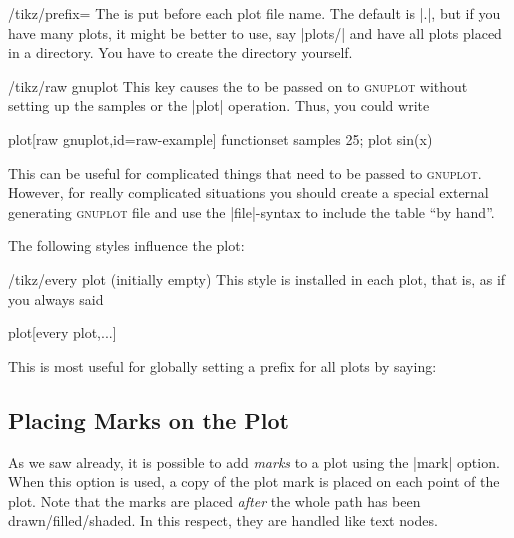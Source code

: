 \begin{key}{/tikz/prefix=}
    The  is put before each plot file name. The default is
    |\jobname.|, but if you have many plots, it might be better to use, say
    |plots/| and have all plots placed in a directory. You have to create the
    directory yourself.
\end{key}

\begin{key}{/tikz/raw gnuplot}
    This key causes the  to be passed on to
    \textsc{gnuplot} without setting up the samples or the |plot| operation.
    Thus, you could write
\begin{codeexample}
plot[raw gnuplot,id=raw-example] function{set samples 25; plot sin(x)}
\end{codeexample}
    This can be useful for complicated things that need to be passed to
    \textsc{gnuplot}. However, for really complicated situations you should
    create a special external generating \textsc{gnuplot} file and use the
    |file|-syntax to include the table ``by hand''.
\end{key}

The following styles influence the plot:
%
\begin{stylekey}{/tikz/every plot (initially \normalfont empty)}
    This style is installed in each plot, that is, as if you always said
\begin{codeexample}
  plot[every plot,...]
\end{codeexample}
    This is most useful for globally setting a prefix for all plots by saying:
\begin{codeexample}
\end{codeexample}
\end{stylekey}


\subsection{Placing Marks on the Plot}

As we saw already, it is possible to add \emph{marks} to a plot using the
|mark| option. When this option is used, a copy of the plot mark is placed on
each point of the plot. Note that the marks are placed \emph{after} the whole
path has been drawn/filled/shaded. In this respect, they are handled like text
nodes.

